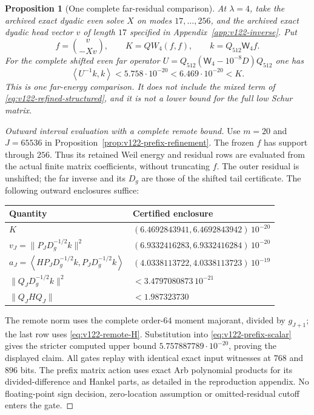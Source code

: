 \documentclass[11pt]{article}
\newtheorem{proposition}[theorem]{Proposition}
\theoremstyle{remark}
\newcommand{\ip}[2]{\left\langle #1,#2\right\rangle}
\begin{document}
\begin{proposition}[One complete far-residual comparison]
\label{prop:v122-directional-far}
At $\lambda=4$, take the archived exact dyadic even solve $X$
on modes $17,\ldots,256$, and the archived exact dyadic head
vector $v$ of length $17$ specified in
Appendix~\ref{app:v122-inverse}. Put
\[
 f=\binom{v}{-Xv},\qquad K=QW_4(f,f),\qquad
 k=Q_{512}\mathsf W_4 f.
\]
For the complete shifted even far operator
$U=Q_{512}(\mathsf W_4-10^{-8}D)Q_{512}$ one has
\begin{equation}\label{eq:v122-directional-far}
 \ip{U^{-1}k}{k}<5.758\cdot10^{-20}
 <6.469\cdot10^{-20}<K.
\end{equation}
This is one far-energy comparison. It does not include the mixed
term of \eqref{eq:v122-refined-structured}, and it is not a lower
bound for the full low Schur matrix.
\end{proposition}
\begin{proof}[Outward interval evaluation with a complete remote bound]
Use $m=20$ and $J=65536$ in
Proposition~\ref{prop:v122-prefix-refinement}. The frozen $f$ has
support through $256$. Thus its retained Weil energy and residual
rows are evaluated from the actual finite matrix coefficients,
without truncating $f$. The outer residual is unshifted; the far
inverse and its $D_g$ are those of the shifted tail certificate.
The following outward enclosures suffice:
\begin{center}
\begin{tabular}{@{}ll@{}}
\toprule Quantity & Certified enclosure\\\midrule
$K$ & $(6.4692843941,6.4692843942)\,10^{-20}$\\
$v_J=\|P_JD_g^{-1/2}k\|^2$ & $(6.9332416283,6.9332416284)\,10^{-20}$\\
$a_J=\ip{HP_JD_g^{-1/2}k}{P_JD_g^{-1/2}k}$
 & $(4.0338113722,4.0338113723)\,10^{-19}$\\
$\|Q_JD_g^{-1/2}k\|^2$ & $<3.4797080873\,10^{-21}$\\
$\|Q_JHQ_J\|$ & $<1.987323730$\\\bottomrule
\end{tabular}
\end{center}
The remote norm uses the complete order-$64$ moment majorant,
divided by $g_{J+1}$; the last row uses
\eqref{eq:v122-remote-H}. Substitution into
\eqref{eq:v122-prefix-scalar} gives the stricter computed upper
bound $5.757887789\cdot10^{-20}$, proving the displayed claim.
All gates replay with identical exact input witnesses at $768$ and
$896$ bits. The prefix matrix action uses exact Arb polynomial
products for its divided-difference and Hankel parts, as detailed
in the reproduction appendix. No floating-point sign decision,
zero-location assumption or omitted-residual cutoff enters the gate.
\end{proof}
\end{document}
